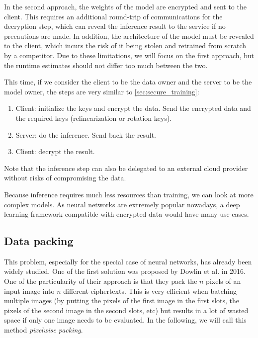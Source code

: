 \documentclass[a4paper,11pt,oneside]{report}
\begin{document}
In the second approach, the weights of the model are encrypted and sent to the client. 
This requires an additional round-trip of communications for the decryption step, which can reveal the inference result to the service if no precautions are made. 
In addition, the architecture of the model must be revealed to the client, which incurs the risk of it being stolen and retrained from scratch by a competitor. 
Due to these limitations, we will focus on the first approach, but the runtime estimates should not differ too much between the two.

This time, if we consider the client to be the data owner and the server to be the model owner, the steps are very similar to \autoref{sec:secure_training}:
\begin{enumerate}
    \item Client: initialize the keys and encrypt the data. Send the encrypted data and the required keys (relinearization or rotation keys).
    \item Server: do the inference. Send back the result.
    \item Client: decrypt the result.
\end{enumerate}

Note that the inference step can also be delegated to an external cloud provider without risks of compromising the data.

Because inference requires much less resources than training, we can look at more complex models. 
As neural networks are extremely popular nowadays, a deep learning framework compatible with encrypted data would have many use-cases.

\subsection{Data packing}

This problem, especially for the special case of neural networks, has already been widely studied. One of the first solution was proposed by Dowlin et al. \cite{dowlin_cryptonets_2016} in 2016. 
One of the particularity of their approach is that they pack the $n$ pixels of an input image into $n$ different ciphertexts. 
This is very efficient when batching multiple images (by putting the pixels of the first image in the first slots, the pixels of the second image in the second slots, etc) but results in a lot of wasted space if only one image needs to be evaluated. 
In the following, we will call this method \emph{pixelwise packing}.
\end{document}
